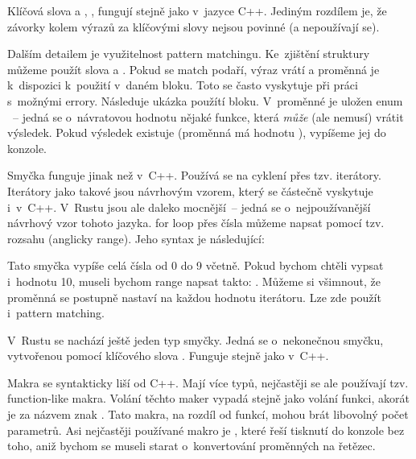 \documentclass[main.tex]{subfiles}
\begin{document}

Klíčová slova  a , ,  fungují stejně
jako v~jazyce C++. Jediným rozdílem je, že závorky kolem výrazů za klíčovými slovy
nejsou povinné (a nepoužívají se).

Dalším detailem je využitelnost pattern matchingu. Ke~zjištění struktury můžeme použít
slova  a . Pokud se match podaří, výraz vrátí
 a proměnná je k~dispozici k~použití v~daném bloku. Toto se často vyskytuje
při práci s~možnými errory. Následuje ukázka použítí  bloku. V~proměnné
 je uložen enum ~-- jedná se o~návratovou
hodnotu nějaké funkce, která \emph{může} (ale nemusí) vrátit výsledek. Pokud výsledek
existuje (proměnná má hodnotu ), vypíšeme jej do konzole.

\obrazek
{}


Smyčka  funguje jinak než v~C++. Používá se na cyklení přes tzv. iterátory.
Iterátory jako takové jsou návrhovým vzorem, který se částečně vyskytuje i~v~C++.
V~Rustu jsou ale daleko mocnější~-- jedná se o~nejpoužívanější návrhový vzor tohoto
jazyka.  for loop přes čísla můžeme napsat pomocí tzv. rozsahu
(anglicky range). Jeho syntax je následující:

\obrazek
{}

Tato smyčka vypíše celá čísla od 0 do 9 včetně. Pokud bychom chtěli vypsat i~hodnotu 10,
museli bychom range napsat takto: . Můžeme si všimnout, že proměnná
 se postupně nastaví na každou hodnotu iterátoru. Lze zde použít i~pattern
matching.


V~Rustu se nachází ještě jeden typ smyčky. Jedná se o~nekonečnou smyčku, vytvořenou
pomocí klíčového slova . Funguje stejně jako  v~C++.


Makra se syntakticky liší od C++. Mají více typů, nejčastěji se ale používají tzv.
function-like makra. Volání těchto maker vypadá stejně jako volání funkci, akorát je za
názvem znak \irust{!}. Tato makra, na rozdíl od funkcí, mohou brát libovolný počet
parametrů. Asi nejčastěji používané makro je , které řeší tisknutí do
konzole bez toho, aniž bychom se museli starat o~konvertování proměnných na řetězec.
\end{document}
